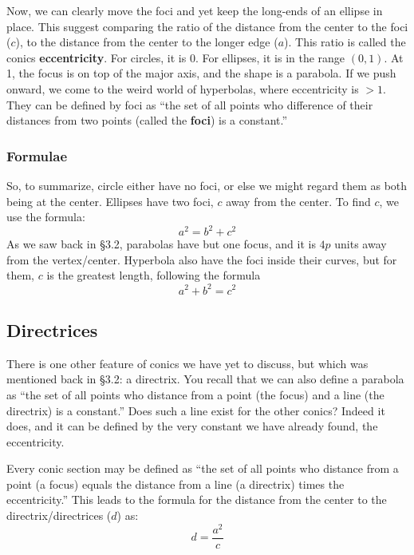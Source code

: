 Now, we can clearly move the foci and yet keep the long-ends of an ellipse in place.  This
suggest comparing the ratio of the distance from the center to the foci ($c$), to the distance
from the center to the longer edge ($a$).  This ratio is called the conics \textbf{eccentricity}.
For circles, it is 0.  For ellipses, it is in the range $(0,1)$.  At 1, the focus is on top of the major
axis, and the shape is a parabola.    If we push onward, we come to the weird world of
hyperbolas, where eccentricity is $>1$.  They can be defined by foci as ``the set of all points
who difference of their distances from two points (called the \textbf{foci}) is a constant.''

\subsubsection{Formulae}
So, to summarize, circle either have no foci, or else we might regard them as both being at
the center.  Ellipses have two foci, $c$ away from the center.  To find $c$, we use the
formula:
\begin{equation}
a^2 = b^2 + c^2
\end{equation}
As we saw back in §3.2, parabolas have but one focus, and it is $4p$ units away from the
vertex/center.  Hyperbola also have the foci inside their curves, but for them, $c$ is the
greatest length, following the formula
\begin{equation}
a^2 + b^2 = c^2
\end{equation}

\subsection{Directrices}
There is one other feature of conics we have yet to discuss, but which was mentioned back
in §3.2: a directrix.  You recall that we can also define a parabola as ``the set of all points
who distance from a point (the focus) and a line (the directrix) is a constant.''  Does such a line
exist for the other conics?  Indeed it does, and it can be defined by the very constant we have
already found, the eccentricity.

Every conic section may be defined as ``the set of all points who distance from a point
(a focus) equals the distance from a line (a directrix) times the eccentricity.''  This leads to
the formula for the distance from the center to the directrix/directrices ($d$) as:
\begin{equation}
d = \frac{a^2}{c}
\end{equation}

